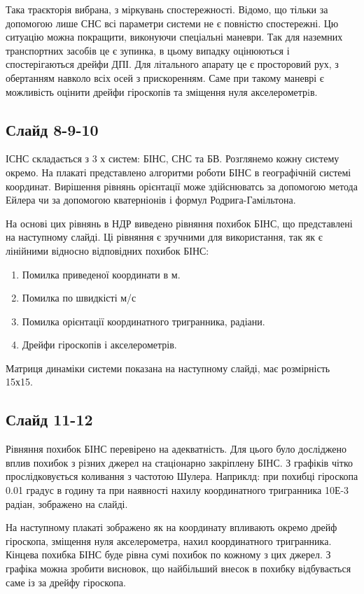 \documentclass[ukrainian,utf8,simple,floatsubsection, hpadding=1mm,equationsubsection,]{eskdtext}
\begin{document}
Така траєкторія вибрана, з міркувань спостережності. Відомо, що тільки за допомогою лише СНС всі параметри системи не є повністю спостережні. Цю ситуацію можна покращити, виконуючи спеціальні маневри. Так для наземних транспортних засобів це є зупинка, в цьому випадку оцінюються і спостерігаються дрейфи ДПІ. Для літального апарату це є просторовий рух, з обертанням навколо всіх осей з прискоренням. Саме при такому маневрі є можливість оцінити дрейфи гіроскопів та зміщення нуля акселерометрiв.
\subsection*{Слайд 8-9-10}

ІСНС складається з 3 х систем: БІНС, СНС та БВ. Розглянемо кожну систему окремо. На плакаті представлено алгоритми роботи БІНС в географічній системі координат. Вирішення рівнянь орієнтації може здійснюватсь за допомогою метода Ейлера чи за допомогою кватерніонів і формул Родрига-Гамільтона.

На основі цих рівнянь в НДР виведено рівняння похибок БІНС, що представлені на наступному слайді. 
Ці рівняння є зручними для використання, так як є лінійними відносно відповідних похибок БІНС:
\begin{enumerate}
 \item Помилка приведеної координати в м.
 \item Помилка по швидкісті м/с
 \item Помилка орієнтації координатного тригранника, радіани.
 \item Дрейфи гіроскопів і акселерометрів.
\end{enumerate}
Матриця динаміки системи показана на наступному слайді, має розмірність 15х15.

\subsection*{Слайд 11-12}
Рівняння похибок БІНС перевірено на адекватність. Для цього було досліджено вплив похибок з різних джерел на стаціонарно закріплену БІНС. З графіків чітко прослідковується коливання з частотою Шулера. Наприклд: при похибці гіроскопа 0.01 градус в годину та при наявності нахилу координатного тригранника 10Е-3 радіан, зображено на слайді.

На наступному плакаті зображено як на координату впливають окремо дрейф гіроскопа, зміщення нуля акселерометра, нахил координатного тригранника. Кінцева похибка БІНС буде рівна сумі похибок по кожному з цих джерел. З графіка можна зробити висновок, що найбільший внесок в похибку відбувається саме із за дрейфу гіроскопа.
\end{document}
